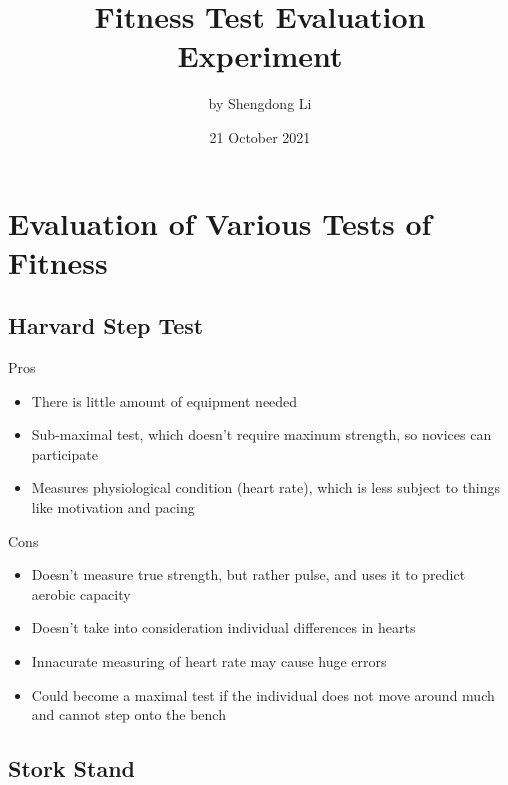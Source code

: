 \documentclass[12pt]{article}
\begin{document}
\title{Fitness Test Evaluation Experiment}
\author{by Shengdong Li}
\date{21 October 2021}
\maketitle

\section*{Evaluation of Various Tests of Fitness}

\subsection*{Harvard Step Test}

\begin{minipage}[t]{0.5\textwidth}
    \begin{center}Pros\end{center}
    \begin{itemize}
        \item There is little amount of equipment needed
        \item Sub-maximal test, which doesn't require maxinum strength, so novices can participate
        \item Measures physiological condition (heart rate), which is less subject to things like motivation and pacing
    \end{itemize}
\end{minipage}
\begin{minipage}[t]{0.5\textwidth}
    \begin{center}Cons\end{center}
    \begin{itemize}
        \item Doesn't measure true strength, but rather pulse, and uses it to predict aerobic capacity
        \item Doesn't take into consideration individual differences in hearts
        \item Innacurate measuring of heart rate may cause huge errors
        \item Could become a maximal test if the individual does not move around much and cannot step onto the bench
    \end{itemize}
\end{minipage}

\subsection*{Stork Stand}
\end{document}
